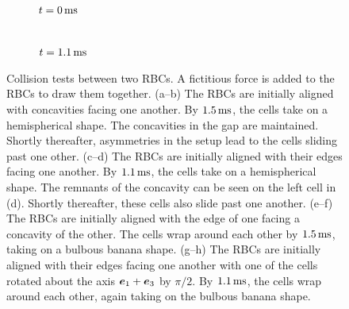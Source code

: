 \begin{figure}[t]
\begin{subfigure}[t]{.25\textwidth}
        $t = 0\ms$
    \end{subfigure}%
    \begin{subfigure}[t]{.25\textwidth}
        \centering
         \\
        $t = 1.1\ms$
    \end{subfigure}
    \caption{%
Collision tests between two RBCs. A fictitious force is added to the RBCs to draw them
together. (a--b) The RBCs are initially aligned with concavities facing one another. By
$1.5\ms$, the cells take on a hemispherical shape. The concavities in the gap are
maintained. Shortly thereafter, asymmetries in the setup lead to the cells sliding past
one other. (c--d) The RBCs are initially aligned with their edges facing one
another. By $1.1\ms$, the cells take on a hemispherical shape. The remnants of the
concavity can be seen on the left cell in (d). Shortly thereafter, these cells also slide
past one another. (e--f) The RBCs are initially aligned with the edge of one facing a
concavity of the other. The cells wrap around each other by $1.5\ms$, taking on a bulbous
banana shape. (g--h) The RBCs are initially aligned with their edges facing one another
with one of the cells rotated about the axis $\boldsymbol{e}_1+\boldsymbol{e}_3$ by $\pi/2$. By $1.1\ms$, the
cells wrap around each other, again taking on the bulbous banana shape.
    }%
    \label{fig:collisions}
\end{figure}

